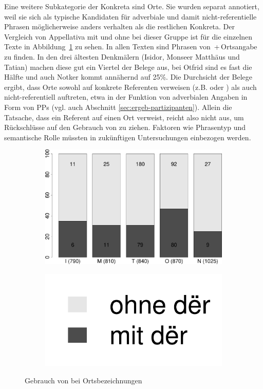 Eine weitere Subkategorie der Konkreta  sind Orte. Sie wurden separat annotiert, weil sie sich als typische Kandidaten für adverbiale  und damit nicht-referentielle Phrasen möglicherweise anders verhalten als die restlichen  Konkreta. Der Vergleich von Appellativa  mit und ohne  bei dieser Gruppe ist für die einzelnen Texte in Abbildung~\ref{fig:bel:orte} zu sehen. In allen Texten sind Phrasen von \,+\,Ortsangabe zu finden. In den drei ältesten Denkmälern (Isidor, Monseer Matthäus und Tatian) machen diese gut ein Viertel der Belege aus, bei Otfrid sind es fast die Hälfte und auch Notker kommt annähernd auf 25\%. Die Durchsicht der Belege ergibt, dass Orte sowohl auf konkrete Referenten verweisen (z.B.  oder ) als auch nicht-referentiell auftreten, etwa in der Funktion von adverbialen  Angaben in Form von PPs (vgl. auch Abschnitt \ref{sec:ergeb-partizipanten}).
Allein die Tatsache, dass ein Referent auf einen Ort verweist, reicht also nicht aus, um Rückschlüsse auf den Gebrauch von  zu ziehen. Faktoren wie Phrasentyp und semantische Rolle  müssten in zukünftigen Untersuchungen einbezogen werden.  

\begin{figure}
\begin{subfigure}[c]{.75\linewidth}
  \includegraphics[width=\linewidth]{generated/images/ort}
\end{subfigure}%
\begin{subfigure}[c]{.2\linewidth}
  \includegraphics[width=.85\linewidth]{generated/images/ort-legende}
\end{subfigure}
\caption{Gebrauch von  bei Ortsbezeichnungen}
  \label{fig:bel:orte}
\end{figure} 

